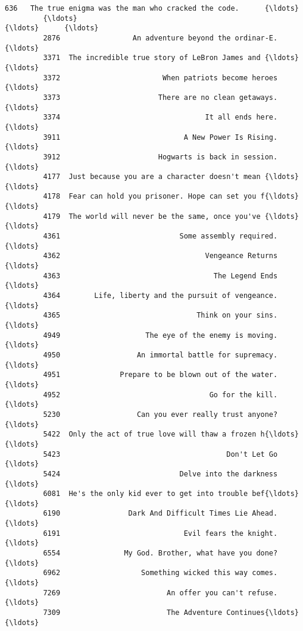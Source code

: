 \documentclass[11pt]{article}
\begin{document}
\begin{Verbatim}[commandchars=\\\{\}]
         636   The true enigma was the man who cracked the code.      {\ldots}        
         {\ldots}                                                 {\ldots}      {\ldots}        
         2876                 An adventure beyond the ordinar-E.      {\ldots}        
         3371  The incredible true story of LeBron James and {\ldots}      {\ldots}        
         3372                        When patriots become heroes      {\ldots}        
         3373                       There are no clean getaways.      {\ldots}        
         3374                                  It all ends here.      {\ldots}        
         3911                             A New Power Is Rising.      {\ldots}        
         3912                       Hogwarts is back in session.      {\ldots}        
         4177  Just because you are a character doesn't mean {\ldots}      {\ldots}        
         4178  Fear can hold you prisoner. Hope can set you f{\ldots}      {\ldots}        
         4179  The world will never be the same, once you've {\ldots}      {\ldots}        
         4361                            Some assembly required.      {\ldots}        
         4362                                  Vengeance Returns      {\ldots}        
         4363                                    The Legend Ends      {\ldots}        
         4364        Life, liberty and the pursuit of vengeance.      {\ldots}        
         4365                                Think on your sins.      {\ldots}        
         4949                    The eye of the enemy is moving.      {\ldots}        
         4950                  An immortal battle for supremacy.      {\ldots}        
         4951              Prepare to be blown out of the water.      {\ldots}        
         4952                                   Go for the kill.      {\ldots}        
         5230                  Can you ever really trust anyone?      {\ldots}        
         5422  Only the act of true love will thaw a frozen h{\ldots}      {\ldots}        
         5423                                       Don't Let Go      {\ldots}        
         5424                            Delve into the darkness      {\ldots}        
         6081  He's the only kid ever to get into trouble bef{\ldots}      {\ldots}        
         6190                Dark And Difficult Times Lie Ahead.      {\ldots}        
         6191                             Evil fears the knight.      {\ldots}        
         6554               My God. Brother, what have you done?      {\ldots}        
         6962                   Something wicked this way comes.      {\ldots}        
         7269                         An offer you can't refuse.      {\ldots}        
         7309                         The Adventure Continues{\ldots}      {\ldots}        
         

\end{Verbatim}
\end{document}
